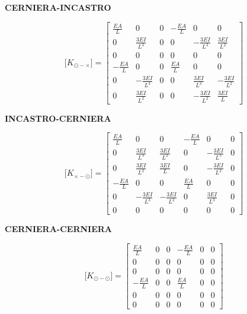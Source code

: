 \documentclass[10pt,a4paper]{article}
\begin{document}
\vspace{1em}
\textbf{CERNIERA-INCASTRO}

\begin{equation}
    \mathbf[K_{\odot-\times}] =
        \begin{bmatrix}
        \frac{EA}{L}  & 0  & 0  & -\frac{EA}{L}  & 0  & 0 \\[10pt]
        0  & \frac{3EI}{L^3}  & 0  & 0  & -\frac{3EI}{L^3}  & \frac{3EI}{L^2} \\[10pt]
        0  & 0  & 0  & 0  & 0  & 0 \\[10pt]
        -\frac{EA}{L}  & 0  & 0  & \frac{EA}{L}  & 0  & 0 \\[10pt]
        0  & -\frac{3EI}{L^3}  & 0  & 0  & \frac{3EI}{L^3}  & -\frac{3EI}{L^2} \\[10pt]
        0  & \frac{3EI}{L^2}  & 0  & 0  & -\frac{3EI}{L^2}  & \frac{3EI}{L}
        \end{bmatrix}
\end{equation}


\vspace{1em}
\textbf{INCASTRO-CERNIERA}

\begin{equation}
    \mathbf[K_{\times-\odot}] =
        \begin{bmatrix}
            \frac{EA}{L} & 0 & 0 & -\frac{EA}{L} & 0 & 0 \\[10pt]
            0 & \frac{3EI}{L^3} & \frac{3EI}{L^2} & 0 & -\frac{3EI}{L^3} & 0 \\[10pt]
            0 & \frac{3EI}{L^2} & \frac{3EI}{L} & 0 & -\frac{3EI}{L^2} & 0 \\[10pt]
            -\frac{EA}{L} & 0 & 0 & \frac{EA}{L} & 0 & 0 \\[10pt]
            0 & -\frac{3EI}{L^3} & -\frac{3EI}{L^2} & 0 & \frac{3EI}{L^3} & 0 \\[10pt]
            0 & 0 & 0 & 0 & 0 & 0 
        \end{bmatrix}
\end{equation}


\vspace{1em}
\textbf{CERNIERA-CERNIERA}

\begin{equation}
    \mathbf[K_{\odot-\odot}] =
        \begin{bmatrix}
            \frac{EA}{L} & 0 & 0 & -\frac{EA}{L} & 0 & 0 \\[10pt]
            0 & 0 & 0 & 0 & 0 & 0 \\[10pt]
            0 & 0 & 0 & 0 & 0 & 0 \\[10pt]
            -\frac{EA}{L} & 0 & 0 & \frac{EA}{L} & 0 & 0 \\[10pt]
            0 & 0 & 0 & 0 & 0 & 0 \\[10pt]
            0 & 0 & 0 & 0 & 0 & 0
        \end{bmatrix}
\end{equation}
\end{document}
